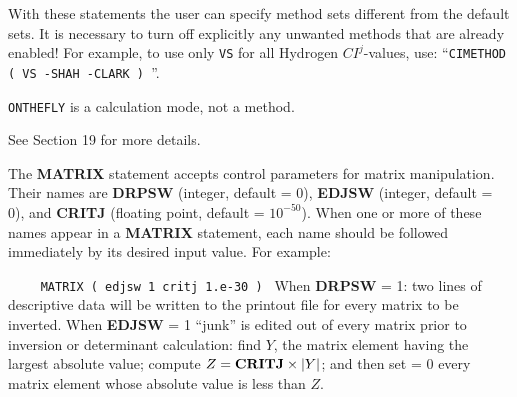 With these statements the user can specify method
sets different from the default sets. It is necessary to turn off explicitly
any unwanted methods that are already enabled! For example, to use only
{\tt VS} for all Hydrogen $CI^j$-values, use: 
``{\tt CIMETHOD ( VS -SHAH -CLARK ) }''. 

{\tt ONTHEFLY} is a calculation mode, not a method.

See Section 19 for more details.
\blankline
\blankline
\centerline{}
\space \noindent
The {\bf MATRIX} statement accepts control parameters for matrix manipulation.
Their names are {\bf DRPSW} (integer, default = 0), {\bf EDJSW} (integer,
default = 0), and {\bf CRITJ} (floating point, default = $10^{-50}$). When
one or more of these names appear in a {\bf MATRIX} statement, each name
should be followed immediately by its desired input value. For example:

$\qquad$ {\tt MATRIX ( edjsw 1  critj 1.e-30 )  }
\blankline
\noindent When {\bf DRPSW} = 1: two lines of descriptive data will be written
to the printout file for every matrix to be inverted.
\blankline
\noindent When {\bf EDJSW} = 1 ``junk'' is edited out of every matrix prior
to inversion or determinant calculation: find $Y$, the matrix element having
the largest absolute value; compute $Z = {\bf CRITJ} \times |Y|$; and then
set = 0 every matrix element whose absolute value is less than $Z$.
